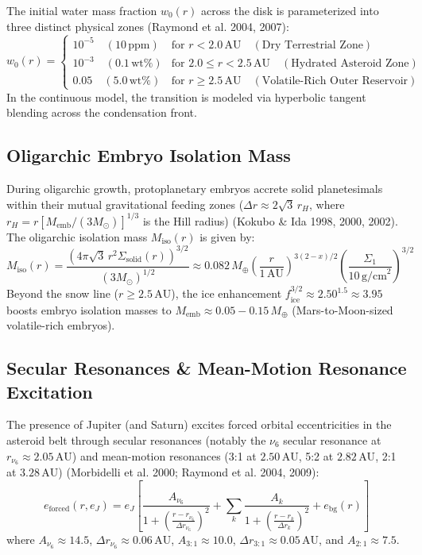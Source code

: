\documentclass[11pt,a4paper]{article}
\begin{document}
The initial water mass fraction $w_0(r)$ across the disk is parameterized into three distinct physical zones (Raymond et al. 2004, 2007):
\begin{equation}
w_0(r) = 
\begin{cases}
10^{-5} \quad (10\,\text{ppm}) & \text{for } r < 2.0\,\text{AU} \quad (\text{Dry Terrestrial Zone}) \\
10^{-3} \quad (0.1\,\text{wt}\%) & \text{for } 2.0 \le r < 2.5\,\text{AU} \quad (\text{Hydrated Asteroid Zone}) \\
0.05 \quad (5.0\,\text{wt}\%) & \text{for } r \ge 2.5\,\text{AU} \quad (\text{Volatile-Rich Outer Reservoir})
\end{cases}
\label{eq:w0_profile}
\end{equation}
In the continuous model, the transition is modeled via hyperbolic tangent blending across the condensation front.

\subsection{Oligarchic Embryo Isolation Mass}
During oligarchic growth, protoplanetary embryos accrete solid planetesimals within their mutual gravitational feeding zones ($\Delta r \approx 2\sqrt{3}\,r_H$, where $r_H = r [M_{\text{emb}} / (3M_\odot)]^{1/3}$ is the Hill radius) (Kokubo \& Ida 1998, 2000, 2002). The oligarchic isolation mass $M_{\text{iso}}(r)$ is given by:
\begin{equation}
M_{\text{iso}}(r) = \frac{\left(4\pi \sqrt{3}\,r^2 \Sigma_{\text{solid}}(r)\right)^{3/2}}{\left(3 M_\odot\right)^{1/2}} \approx 0.082\,M_\oplus \left(\frac{r}{1\,\text{AU}}\right)^{3(2-x)/2} \left(\frac{\Sigma_1}{10\,\text{g/cm}^2}\right)^{3/2}
\label{eq:m_iso}
\end{equation}
Beyond the snow line ($r \ge 2.5\,\text{AU}$), the ice enhancement $f_{\text{ice}}^{3/2} \approx 2.50^{1.5} \approx 3.95$ boosts embryo isolation masses to $M_{\text{emb}} \approx 0.05 - 0.15\,M_\oplus$ (Mars-to-Moon-sized volatile-rich embryos).

\subsection{Secular Resonances \& Mean-Motion Resonance Excitation}
The presence of Jupiter (and Saturn) excites forced orbital eccentricities in the asteroid belt through secular resonances (notably the $\nu_6$ secular resonance at $r_{\nu_6} \approx 2.05\,\text{AU}$) and mean-motion resonances (3:1 at $2.50\,\text{AU}$, 5:2 at $2.82\,\text{AU}$, 2:1 at $3.28\,\text{AU}$) (Morbidelli et al. 2000; Raymond et al. 2004, 2009):
\begin{equation}
e_{\text{forced}}(r, e_J) = e_J \left[ \frac{A_{\nu_6}}{1 + \left(\frac{r - r_{\nu_6}}{\Delta r_{\nu_6}}\right)^2} + \sum_{k} \frac{A_k}{1 + \left(\frac{r - r_k}{\Delta r_k}\right)^2} + e_{\text{bg}}(r) \right]
\label{eq:e_forced}
\end{equation}
where $A_{\nu_6} \approx 14.5$, $\Delta r_{\nu_6} \approx 0.06\,\text{AU}$, $A_{3:1} \approx 10.0$, $\Delta r_{3:1} \approx 0.05\,\text{AU}$, and $A_{2:1} \approx 7.5$.
\end{document}
